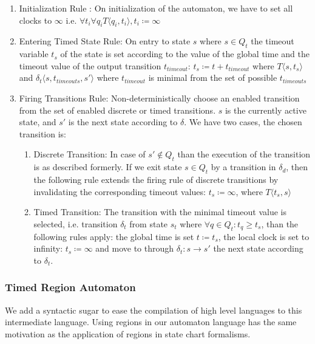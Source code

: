 				\begin{enumerate}
					\item Initialization Rule : On initialization of the automaton, we have to set all clocks to $\infty$ 
					i.e. $\forall t_i \forall q_i T \langle q_i, t_i \rangle, t_i \coloneqq \infty $
					
					\item Entering Timed State Rule: On entry to state $s$ where $s \in Q_t$ the timeout variable $t_s$ of the state is set according to the value of the global time and the timeout value of the output transition $t_{timeout}$:
						$t_s\coloneqq t+t_{timeout}$
						where $T\langle s,t_s \rangle$ and $\delta_t\langle s,t_{timeouts},s' \rangle$ where $t_{timeout}$ is minimal from the set of possible $t_{timeouts}$ 
					
					\item Firing Transitions Rule: Non-deterministically choose an enabled transition from the set of enabled discrete or timed transitions. 
						$s$ is the currently active state, and $s'$ is the next state according to $\delta$.
						We have two cases, the chosen transition is:
						\begin{enumerate}
							\item Discrete Transition: In case of $s' \notin Q_t$ than the execution of the transition is as described formerly. 
							If we exit state $s \in Q_t$ by a transition in $\delta_d$, 
							then the following rule extends the firing rule of discrete transitions by invalidating the corresponding timeout values:
								$t_s \coloneqq \infty$, where $T \langle t_s, s \rangle$
							\item Timed Transition: The transition with the minimal timeout value is selected, 
								i.e. transition $\delta_t$ from state $s_t$ where $\forall q \in Q_t: t_q \geq t_s$, than the following rules apply:
								the global time is set $t \coloneqq t_s$, the local clock is set to infinity: 
								$t_s \coloneqq \infty$ and move to through $\delta_t : s \rightarrow s'$ the next state according to $\delta_t$.
						\end{enumerate}			
				\end{enumerate}
				
				
			
			\subsubsection{Timed Region Automaton}
			
				We add a syntactic sugar to ease the compilation of high level languages to this intermediate language.
				Using regions in our automaton language has the same motivation as the application of regions in state chart formalisms.
			
